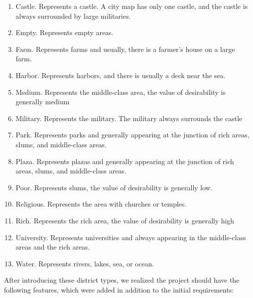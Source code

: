 \begin{enumerate}
  \item Castle. Represents a castle. A city map has only one castle, and the castle is always surrounded by large militaries.
  \item Empty. Represents empty areas.
  \item Farm. Represents farms and usually, there is a farmer’s house on a large farm.
  \item Harbor. Represents harbors, and there is usually a deck near the sea.
  \item Medium. Represents the middle-class area, the value of desirability is generally medium
  \item Military. Represents the military. The military always surrounds the castle
  \item Park. Represents parks and generally appearing at the junction of rich areas,  slums, and middle-class areas.
  \item Plaza. Represents plazas and generally appearing at the junction of rich areas,  slums, and middle-class areas.
  \item Poor. Represents slums, the value of desirability is generally low.
  \item Religious. Represents the area with churches or temples.
  \item Rich. Represents the rich area, the value of desirability is generally high
  \item University. Represents universities and always appearing in the middle-class areas and the rich areas.
  \item Water. Represents rivers, lakes, sea, or ocean.
\end{enumerate}

After introducing these district types, we realized the project should have the following features, which were added in addition to the initial requirements:

